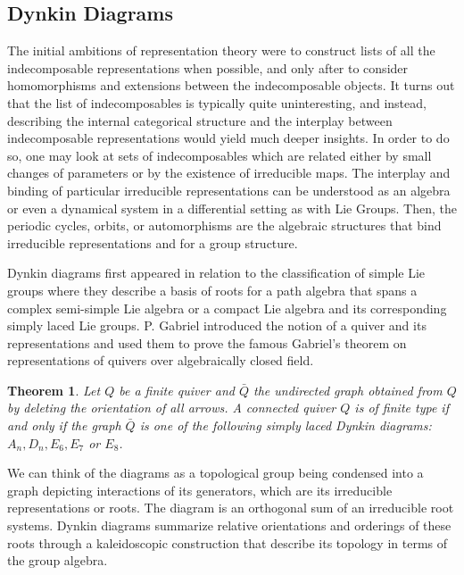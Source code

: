\documentclass{article}
\newtheorem{theorem}{Theorem}[section]
\theoremstyle{definition}
\begin{document}
\subsection{Dynkin Diagrams}
\label{sec:dynkin-diagrams}
The initial ambitions of representation theory were to construct lists of all the indecomposable representations when possible, and only after to consider homomorphisms and extensions between the indecomposable objects. 
It turns out that the list of indecomposables is typically quite uninteresting, and instead, describing the internal categorical structure and the interplay between indecomposable representations would yield much deeper insights. In order to do so, one may look at sets of indecomposables which are related either by small changes of parameters or by the existence of irreducible maps. 
The interplay and binding of particular irreducible representations can be understood as an algebra or even a dynamical system in a differential setting as with Lie Groups. Then, the periodic cycles, orbits, or automorphisms are the algebraic structures that bind irreducible representations and for a group structure.

Dynkin diagrams first appeared in relation to the classification of simple Lie groups where they describe a basis of roots for a path algebra that spans a complex semi-simple Lie algebra or a compact Lie algebra and its corresponding simply laced Lie groups. P. Gabriel introduced the notion of a quiver and its representations and used them to prove the famous Gabriel’s theorem on representations of quivers over algebraically closed field. 

\begin{theorem}
Let $Q$ be a finite quiver and $\bar{Q}$ the undirected graph obtained from $Q$ by deleting the orientation of all arrows. A connected quiver $Q$ is of finite type if and only if the graph $\bar{Q}$ is one of the following simply laced Dynkin diagrams: $A_n, D_n, E_6, E_7$ or $E_8$.
\end{theorem}





We can think of the diagrams as a topological group being condensed into a graph depicting interactions of its generators, which are its irreducible representations or roots. The diagram is an orthogonal sum of an irreducible root systems.
Dynkin diagrams summarize relative orientations and orderings of these roots through a kaleidoscopic construction that describe its topology in terms of the group algebra.
\end{document}
